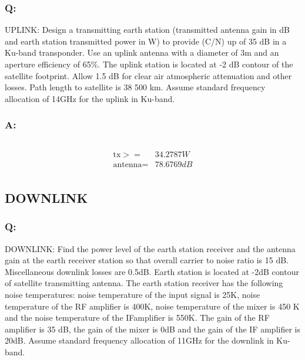 \documentclass[11pt]{article}
\begin{document}
\subsubsection{Q:}
UPLINK: Design a transmitting earth station (transmitted antenna gain in dB and earth station transmitted power in W) to provide (C/N) up of 35 dB in a Ku-band transponder. Use an uplink antenna with a diameter of 3m and an aperture efficiency of 65\%. The uplink station is located at -2 dB contour of the satellite footprint. Allow 1.5 dB for clear air atmospheric attenuation and other losses. Path length to satellite is 38 500 km. Assume standard frequency allocation of 14GHz for the uplink in Ku-band.


\subsubsection{A:}

\begin{scriptsize}
    \inputminted{matlab}{Project/Matlab/UPLINK.m}
\end{scriptsize}

\begin{equation}
    \begin{split}
        \text{tx}>=&34.2787W\\
        \text{antenna} =& 78.6769dB\\
    \end{split}
\end{equation}
\subsection{DOWNLINK}\label{DOWNLINK}

\subsubsection{Q:}

DOWNLINK: Find the power level of the earth station receiver and the antenna gain at the earth receiver station so that overall carrier to noise ratio is 15 dB. Miscellaneous downlink losses are 0.5dB. Earth station is located at -2dB contour of satellite transmitting antenna. The earth station receiver has the following noise temperatures: noise temperature of the input signal is 25K, noise temperature of the RF amplifier is 400K, noise temperature of the mixer is 450 K and the noise temperature of the IFamplifier is 550K. The gain of the RF amplifier is 35 dB, the gain of the mixer is 0dB and the gain of the IF amplifier is 20dB. Assume standard frequency allocation of 11GHz for the downlink in Ku-band.
\end{document}
